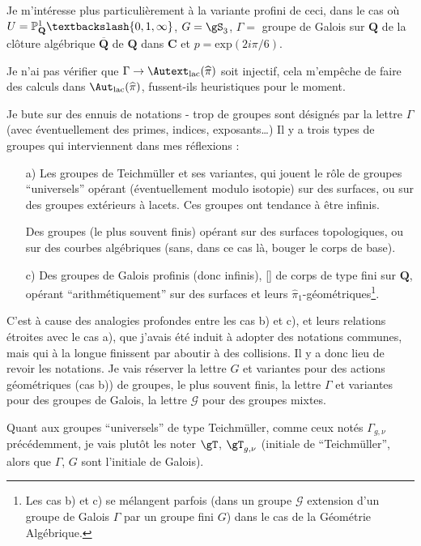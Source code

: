 Je m'intéresse plus particulièrement à la variante profini de ceci, dans le cas où $U = \mathbb{P}^1_{\mathbf{Q}} \textbackslash {0, 1, \infty}$, $G = \gS_3$, $\Gamma =$ groupe de Galois sur $\mathbf{Q}$ de la clôture algébrique $\overline{\mathbf{Q}}$ de $\mathbf{Q}$ dans $\mathbf{C}$ et $p = \text{exp}(2i\pi/6)$.

Je n'ai pas vérifier que $\Gamma \to \Autext_{\text{lac}}(\widehat{\pi})$ soit injectif, cela m'empêche de faire des calculs dans $\Aut_{\text{lac}}(\widehat{\pi})$, fussent-ils heuristiques pour le moment.

Je bute sur des ennuis de notations - trop de groupes sont désignés par la lettre $\Gamma$ (avec éventuellement des primes, indices, exposants\dots) Il y a trois types de groupes qui interviennent dans mes réflexions :
\begin{enumerate}
    \item[a)] Les groupes de Teichmüller et ses variantes, qui jouent le rôle de groupes ``universels'' opérant (éventuellement modulo isotopie) sur des surfaces, ou sur des groupes extérieurs à lacets. Ces groupes ont tendance à être infinis.
    
    Des groupes (le plus souvent finis) opérant sur des surfaces topologiques, ou sur des courbes algébriques (sans, dans ce cas là, bouger le corps de base).
    
    \item[c)] Des groupes de Galois profinis (donc infinis), [] de corps de type fini sur $\mathbf{Q}$, opérant ``arithmétiquement'' sur des surfaces et leurs $\widehat{\pi}_1$-géométriques\footnote{Les cas b) et c) se mélangent parfois (dans un groupe $\mathcal{G}$ extension d'un groupe de Galois $\Gamma$ par un groupe fini $G$) dans le cas de la Géométrie Algébrique.}.
\end{enumerate}

C'est à cause des analogies profondes entre les cas b) et c), et leurs relations étroites avec le cas a), que j'avais été induit à adopter des notations communes, mais qui à la longue finissent par aboutir à des collisions. Il y a donc lieu de revoir les notations. Je vais réserver la lettre $G$ et variantes pour des actions géométriques (cas b)) de groupes, le plus souvent finis, la lettre $\Gamma$ et variantes pour des groupes de Galois, la lettre $\mathcal{G}$ pour des groupes mixtes.

Quant aux groupes ``universels'' de type Teichmüller, comme ceux notés $\Gamma_{g, \nu}$ précédemment, je vais plutôt les noter $\gT$, $\gT_{g, \nu}$ (initiale de ``Teichmüller'', alors que $\Gamma$, $G$ sont l'initiale de Galois).

